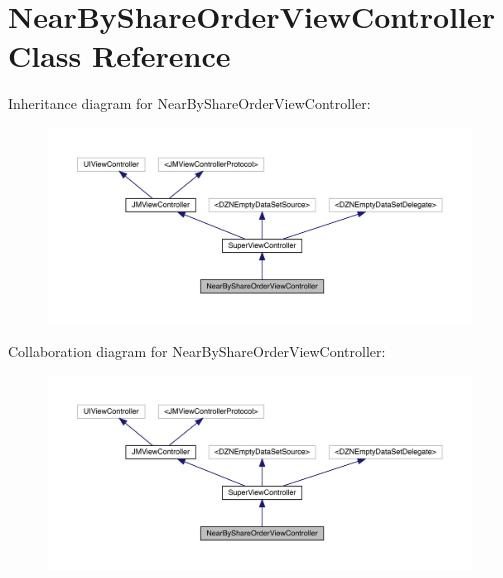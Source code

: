 \hypertarget{interface_near_by_share_order_view_controller}{}\section{Near\+By\+Share\+Order\+View\+Controller Class Reference}
\label{interface_near_by_share_order_view_controller}


Inheritance diagram for Near\+By\+Share\+Order\+View\+Controller\+:\nopagebreak
\begin{figure}[H]
\begin{center}
\leavevmode
\includegraphics[width=350pt]{interface_near_by_share_order_view_controller__inherit__graph}
\end{center}
\end{figure}


Collaboration diagram for Near\+By\+Share\+Order\+View\+Controller\+:\nopagebreak
\begin{figure}[H]
\begin{center}
\leavevmode
\includegraphics[width=350pt]{interface_near_by_share_order_view_controller__coll__graph}
\end{center}
\end{figure}
